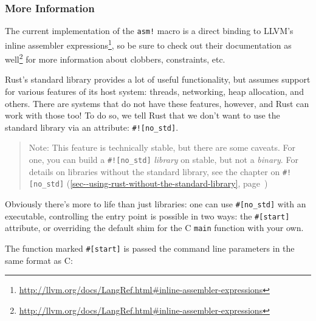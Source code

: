 \documentclass[a4paper,]{book}
\renewcommand*{\hyperref}[2][\ar]{%
  \def\ar{#2}%
  #2 (\autoref{#1}, page~\pageref{#1})}
\renewcommand{\href}[2]{#2\footnote{\url{#1}}}
\begin{document}
\subsubsection{More Information}\label{more-information}

The current implementation of the \texttt{asm!} macro is a direct
binding to
\href{http://llvm.org/docs/LangRef.html\#inline-assembler-expressions}{LLVM's
inline assembler expressions}, so be sure to check out
\href{http://llvm.org/docs/LangRef.html\#inline-assembler-expressions}{their
documentation as well} for more information about clobbers, constraints,
etc.


Rust's standard library provides a lot of useful functionality, but
assumes support for various features of its host system: threads,
networking, heap allocation, and others. There are systems that do not
have these features, however, and Rust can work with those too! To do
so, we tell Rust that we don't want to use the standard library via an
attribute: \texttt{\#!{[}no\_std{]}}.

\begin{quote}
Note: This feature is technically stable, but there are some caveats.
For one, you can build a \texttt{\#!{[}no\_std{]}} \emph{library} on
stable, but not a \emph{binary}. For details on libraries without the
standard library, see
\hyperref[sec--using-rust-without-the-standard-library]{the chapter on
\texttt{\#!{[}no\_std{]}}}
\end{quote}

Obviously there's more to life than just libraries: one can use
\texttt{\#{[}no\_std{]}} with an executable, controlling the entry point
is possible in two ways: the \texttt{\#{[}start{]}} attribute, or
overriding the default shim for the C \texttt{main} function with your
own.

The function marked \texttt{\#{[}start{]}} is passed the command line
parameters in the same format as C:
\end{document}

